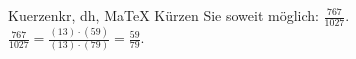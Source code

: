 \begin{MAufgabe}{Kuerzen}{kr, dh, MaTeX}
K\"urzen Sie soweit m\"oglich: $\frac{767}{1027}$.\\ 
\ifLsg\MLoesung
\quad $\frac{767}{1027}=\frac{(13)\cdot(59)}{(13)\cdot(79)}=\frac{59}{79}$.\else\relax\fi
 \end{MAufgabe}